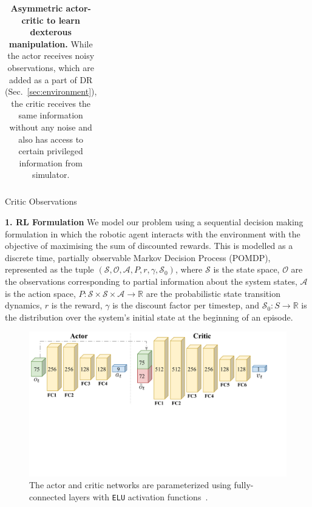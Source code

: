 \documentclass[letterpaper, 10 pt, conference]{ieeeconf}  %
\newcommand{\secref}[1]{Sec.~\ref{#1}}
\begin{document}
\begin{table}[]
\begin{subtable}[h]{\linewidth}
{\begin{sc}
\begin{tabular}{l|l|c}
            \bottomrule
            \end{tabular}
            \end{sc}
        }
        \caption{Critic Observations}
        \label{table:valueobs}
     \end{subtable}
     \caption{\textbf{Asymmetric actor-critic to learn dexterous manipulation.} While the actor receives noisy observations, which are added as a part of DR (\secref{sec:environment}), the critic receives the same information without any noise and also has access to certain privileged information from simulator.}
     \label{tab:temps}
\end{table}

\noindent \textbf{1. RL Formulation} We model our problem using a sequential decision making formulation in which the robotic agent interacts with the environment with the objective of maximising the sum of discounted rewards. This is modelled as a discrete time, partially observable Markov Decision Process (POMDP), represented as the tuple $(\mathcal S, \mathcal O, \mathcal A, P, r, \gamma, \mathcal S_0)$, where $\mathcal S$ is the state space, $\mathcal O$ are the observations corresponding to partial information about the system states, $\mathcal A$ is the action space,  $P: \mathcal S \times \mathcal S \times \mathcal A \to \mathbb{R}$ are the probabilistic state transition dynamics, $r$ is the reward, $\gamma$ is the discount factor per timestep, and $\mathcal S_0: S \to \mathbb{R}$ is the distribution over the system's initial state at the beginning of an episode.

\begin{figure}[t]
    \centering
    \includegraphics[width=0.98\linewidth]{figure/architecture.pdf}
    \caption{
    The actor and critic networks are parameterized using fully-connected layers with \texttt{ELU} activation functions~\cite{clevert2015fast}.
    }   
    \label{fig:architectures}
\end{figure}
\end{document}
